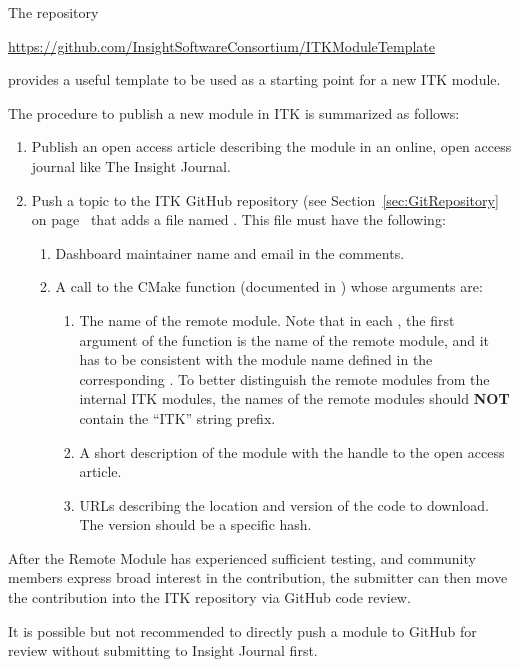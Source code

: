 The repository
\begin{center}
  \url{https://github.com/InsightSoftwareConsortium/ITKModuleTemplate}
\end{center}

provides a useful template to be used as a starting point for a new ITK module.

The procedure to publish a new module in ITK is summarized as follows:
\begin{enumerate}
\item Publish an open access article describing the module in an online, open
  access journal like The Insight Journal.
\item Push a topic to the ITK GitHub repository (see
  Section~\ref{sec:GitRepository} on page~\pageref{sec:GitRepository} that
  adds a file named
  . This file must have the
  following:
  \begin{enumerate}
    \item Dashboard maintainer name and email in the comments.
    \item A call to the  CMake function (documented in
      ) whose arguments are:
      \begin{enumerate}
      \item The name of the remote module. Note that in each
        , the first argument of the function
         is the name of the remote module, and it has to be
        consistent with the module name defined in the corresponding
        . To better distinguish the remote
        modules from the internal ITK modules, the names of the remote modules should
        \textbf{NOT} contain the ``ITK'' string prefix.
      \item A short description of the module with the handle to the open access
        article.
      \item URLs describing the location and version of the code to download. The
        version should be a specific hash.
      \end{enumerate}
  \end{enumerate}
\end{enumerate}

After the Remote Module has experienced sufficient testing, and community
members express broad interest in the contribution, the submitter can then move
the contribution into the ITK repository via GitHub code review.

It is possible but not recommended to directly push a module to GitHub for
review without submitting to Insight Journal first.
